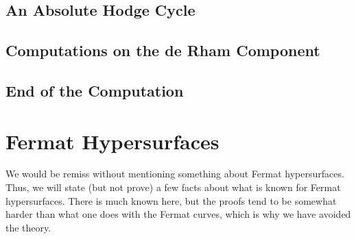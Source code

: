 \documentclass[../thesis.tex]{subfiles}
\begin{document}
\subsection{An Absolute Hodge Cycle}

\subsection{Computations on the de Rham Component}

\subsection{End of the Computation}

\section{Fermat Hypersurfaces}
We would be remiss without mentioning something about Fermat hypersurfaces. Thus, we will state (but not prove) a few facts about what is known for Fermat hypersurfaces. There is much known here, but the proofs tend to be somewhat harder than what one does with the Fermat curves, which is why we have avoided the theory.\todo{}
\end{document}
